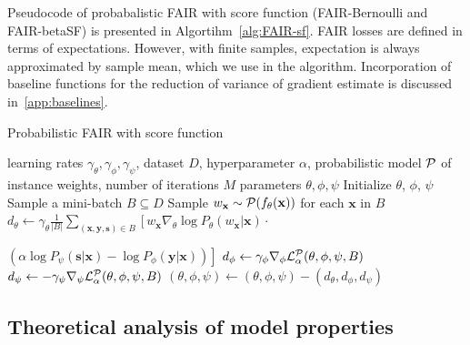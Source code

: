 \documentclass[preprint,12pt]{elsarticle}
\begin{document}
Pseudocode of probabalistic FAIR with score function (FAIR-Bernoulli and FAIR-betaSF) is presented in Algortihm~\ref{alg:FAIR-sf}. FAIR losses are defined in terms of expectations. However, with finite samples, expectation is always approximated by sample mean, which we use in the algorithm. Incorporation of baseline functions for the reduction of variance of gradient estimate is discussed in~\ref{app:baselines}.

\begin{algorithm}
	\caption{Probabilistic FAIR with score function}
	\label{alg:FAIR-sf}
	\begin{algorithmic}
		 learning rates $\gamma_\theta, \gamma_\phi, \gamma_\psi$, dataset $D$,  hyperparameter $\alpha$, probabilistic model ${\cal P}$ of instance weights, number of iterations $M$
		 parameters $\theta,\phi,\psi$
		\vspace{2mm}
		\State Initialize $\theta$, $\phi$, $\psi$
		\State Sample a mini-batch $B\subseteq D$
		\State Sample $w_\mathbf{x}\sim {\cal P}(f_\theta(\mathbf{x}))$ for each $\mathbf{x}$ in $B$
		\State $d_{\theta} \leftarrow \gamma_\theta\frac{1}{|B|} \sum_{(\mathbf{x},\mathbf{y},\mathbf{s})\in B}\left[w_\mathbf{x}\nabla_{\theta}\log P_\theta(w_\mathbf{x}|\mathbf{x})\cdot\right.$
		
		\hspace{3cm}$\left.(\alpha\log P_\psi(\mathbf{s}|\mathbf{x})-\log P_\phi(\mathbf{y}|\mathbf{x}))\right]$
		\State $d_{\phi} \leftarrow \gamma_\phi\nabla_{\phi}{\cal L}^{\cal P}_\alpha(\theta,\phi,\psi,B)$
		\State $d_{\psi} \leftarrow -\gamma_\psi\nabla_{\psi}{\cal L}^{\cal P}_\alpha(\theta,\phi,\psi,B)$
		\State $(\theta,\phi,\psi) \leftarrow (\theta,\phi,\psi) - (d_{\theta}, d_{\phi}, d_{\psi})$
		\EndFor
	\end{algorithmic}
\end{algorithm}



\subsection{Theoretical analysis of model properties}
\end{document}

